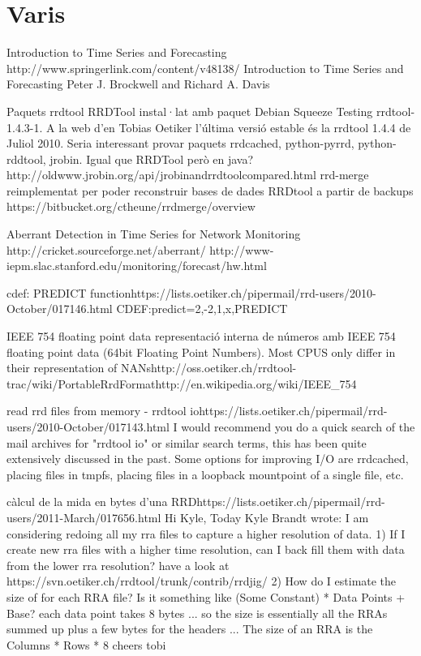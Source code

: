 \section{Varis}

Introduction to Time Series and Forecasting
​http://www.springerlink.com/content/v48138/
Introduction to Time Series and Forecasting 
Peter J. Brockwell and Richard A. Davis



Paquets rrdtool
RRDTool instal·lat amb paquet Debian Squeeze Testing rrdtool-1.4.3-1. A la web d'en Tobias Oetiker l'última versió estable és la rrdtool 1.4.4 de Juliol 2010.
Seria interessant provar paquets rrdcached, python-pyrrd, python-rddtool, 
jrobin. Igual que RRDTool però en java?
​http://oldwww.jrobin.org/api/jrobinandrrdtoolcompared.html
rrd-merge reimplementat per poder reconstruir bases de dades RRDtool a partir de backups
​https://bitbucket.org/ctheune/rrdmerge/overview



Aberrant Detection in Time Series for Network Monitoring
​http://cricket.sourceforge.net/aberrant/
http://www-iepm.slac.stanford.edu/monitoring/forecast/hw.html


cdef: PREDICT function
​https://lists.oetiker.ch/pipermail/rrd-users/2010-October/017146.html
CDEF:predict=2,-2,1,x,PREDICT


IEEE 754 floating point data
representació interna de números amb IEEE 754 floating point data (64bit Floating Point Numbers). Most CPUS only differ in their representation of NANs
​http://oss.oetiker.ch/rrdtool-trac/wiki/PortableRrdFormat
​http://en.wikipedia.org/wiki/IEEE_754

read rrd files from memory - rrdtool io
​https://lists.oetiker.ch/pipermail/rrd-users/2010-October/017143.html
I would recommend you do a quick search of the mail archives for
"rrdtool io" or similar search terms, this has been quite extensively
discussed in the past. Some options for improving I/O are rrdcached,
placing files in tmpfs, placing files in a loopback mountpoint of a
single file, etc.


càlcul de la mida en bytes d'una RRD
​https://lists.oetiker.ch/pipermail/rrd-users/2011-March/017656.html
Hi Kyle,
Today Kyle Brandt wrote:
I am considering redoing all my rra files to capture a higher
resolution of data.
1) If I create new rra files with a higher time resolution, can I back
fill them with data from the lower rra resolution?
have a look at ​https://svn.oetiker.ch/rrdtool/trunk/contrib/rrdjig/
2) How do I estimate the size of for each RRA file? Is it something
like (Some Constant) * Data Points + Base?
each data point takes 8 bytes ... so the size is essentially
all the RRAs summed up plus a few bytes for the headers ...
The size of an RRA is the Columns * Rows * 8
cheers
tobi



